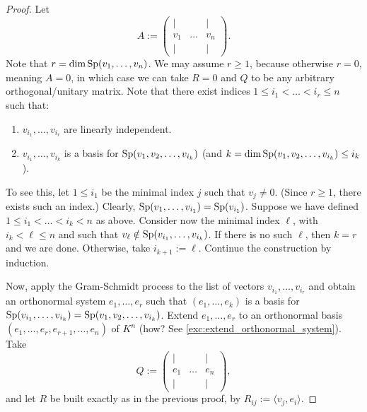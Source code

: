 \begin{proof}
Let
\[
    A := \begin{pmatrix} | & & | \\ v_1 & \dots & v_n \\ | & & | \end{pmatrix}.
\]
Note that $r = \dim \operatorname{Sp}(v_1, \dots, v_n)$.
We may assume $r \geq 1$, because otherwise $r = 0$, meaning $A = 0$, in which case we can take $R = 0$ and $Q$ to be any arbitrary orthogonal/unitary matrix.
Note that there exist indices $1 \leq i_1 < \dots < i_r \leq n$ such that:
\begin{enumerate}[label=\textbf{(\alph*)}]
    \item $v_{i_1}, \dots, v_{i_r}$ are linearly independent.
    \item $v_{i_1}, \dots, v_{i_k}$ is a basis for $\operatorname{Sp}(v_1, v_2, \dots, v_{i_k})$ (and $k = \dim \operatorname{Sp}(v_1, v_2, \dots, v_{i_k}) \leq i_k$).
\end{enumerate}
To see this, let $1 \leq i_1$ be the minimal index $j$ such that $v_j \neq 0$. (Since $r \geq 1$, there exists such an index.) Clearly, $\operatorname{Sp}(v_1, \dots, v_{i_1}) = \operatorname{Sp}(v_{i_1})$. Suppose we have defined $1 \leq i_1 < \dots < i_k < n$ as above. Consider now the minimal index $\ell$, with $i_k < \ell \leq n$ and such that $v_\ell \notin \operatorname{Sp}(v_{i_1}, \dots, v_{i_k})$. If there is no such $\ell$, then $k = r$ and we are done. Otherwise, take $i_{k+1} := \ell$. Continue the construction by induction.

Now, apply the Gram-Schmidt process to the list of vectors $v_{i_1}, \dots, v_{i_r}$ and obtain an orthonormal system $e_1, \dots, e_r$ such that $(e_1, \dots, e_k)$ is a basis for $\operatorname{Sp}(v_{i_1}, \dots, v_{i_k}) = \operatorname{Sp}(v_1, v_2, \dots, v_{i_k})$.
Extend $e_1, \dots, e_r$ to an orthonormal basis $(e_1, \dots, e_r, e_{r+1}, \dots, e_n)$ of $K^n$ (how? See \cref{exc:extend_orthonormal_system}). Take
\[
    Q := \begin{pmatrix} | & & | \\ e_1 & \dots & e_n \\ | & & | \end{pmatrix},
\]
and let $R$ be built exactly as in the previous proof, by $R_{ij} := \langle v_j, e_i \rangle$.


\end{proof}

